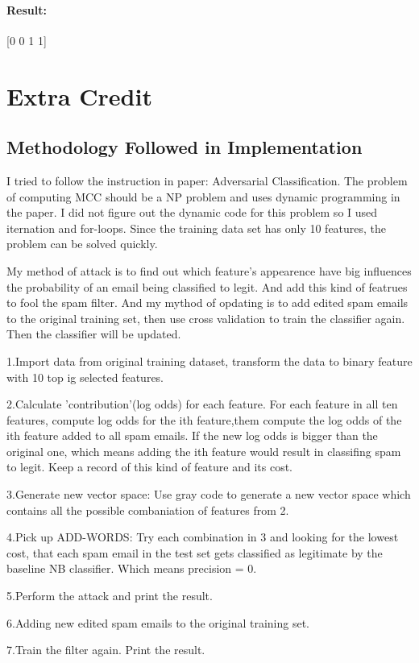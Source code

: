 \documentclass{article}
\begin{document}
\paragraph{Result:}[0 0 1 1]

\section{Extra Credit}
\subsection{Methodology Followed in Implementation} \mbox{}
\par I tried to follow the instruction in paper: Adversarial Classification. The problem of computing MCC should be a NP problem and uses dynamic programming in the paper. I did not figure out the dynamic code for this problem so I used iternation and for-loops. Since the training data set has only 10 features, the problem can be solved quickly. 
\par My method of attack is to find out which feature's appearence have big influences the probability of an email being classified to legit. And add this kind of featrues to fool the spam filter. And my mythod of opdating is to add edited spam emails to the original training set, then use cross validation to train the classifier again. Then the classifier will be updated.\\
\par 1.Import data from original training dataset, transform the data to binary feature with 10 top ig selected features.\\
\par 2.Calculate 'contribution'(log odds) for each feature. For each feature in all ten features, compute log odds for the ith feature,them compute the log odds of the ith feature added to all spam emails. If the new log odds is bigger than the original one, which means adding the ith feature would result in classifing spam to legit. Keep a record of this kind of feature and its cost.\\
\par 3.Generate new vector space: Use gray code to generate a new vector space which contains all the possible combaniation of features from 2.\\
\par 4.Pick up ADD-WORDS: Try each combination in 3 and looking for the lowest cost, that each spam email in the test set gets classified as legitimate by the baseline NB classifier. Which means precision = 0.\\
\par 5.Perform the attack and print the result.\\
\par 6.Adding new edited spam emails to the original training set.\\
\par 7.Train the filter again. Print the result.
\end{document}
